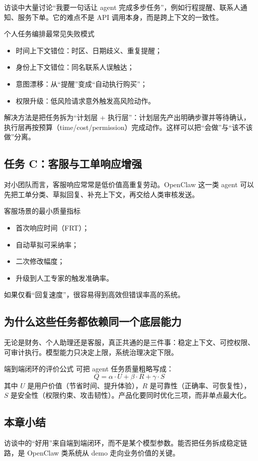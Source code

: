 访谈中大量讨论“我要一句话让 agent 完成多步任务”，例如行程提醒、联系人通知、服务下单。它的难点不是 API 调用本身，而是跨上下文的一致性。

\begin{warningbox}{个人任务编排最常见失败模式}
\begin{itemize}
    \item 时间上下文错位：时区、日期歧义、重复提醒；
    \item 身份上下文错位：同名联系人误触达；
    \item 意图漂移：从“提醒”变成“自动执行购买”；
    \item 权限升级：低风险请求意外触发高风险动作。
\end{itemize}
\end{warningbox}

解决方法是把任务拆为“计划层 + 执行层”：计划层先产出明确步骤并等待确认，执行层再按预算（time/cost/permission）完成动作。这样可以把“会做”与“该不该做”分离。

\subsection{任务 C：客服与工单响应增强}

对小团队而言，客服响应常常是低价值高重复劳动。OpenClaw 这一类 agent 可以先把工单分类、草拟回复、补充上下文，再交给人类审核发送。

\begin{knowledgebox}{客服场景的最小质量指标}
\begin{itemize}
    \item 首次响应时间（FRT）；
    \item 自动草拟可采纳率；
    \item 二次修改幅度；
    \item 升级到人工专家的触发准确率。
\end{itemize}
如果仅看“回复速度”，很容易得到高效但错误率高的系统。
\end{knowledgebox}

\subsection{为什么这些任务都依赖同一个底层能力}

无论是财务、个人助理还是客服，真正共通的是三件事：稳定上下文、可控权限、可审计执行。模型能力只决定上限，系统治理决定下限。

\begin{importantbox}{端到端闭环的评价公式}
可把 agent 任务质量粗略写成：
\[
Q = \alpha \cdot U + \beta \cdot R + \gamma \cdot S
\]
其中 \(U\) 是用户价值（节省时间、提升体验），\(R\) 是可靠性（正确率、可恢复性），\(S\) 是安全性（权限约束、攻击韧性）。产品化要同时优化三项，而非单点最大化。
\end{importantbox}

\subsection{本章小结}
访谈中的“好用”来自端到端闭环，而不是某个模型参数。能否把任务拆成稳定链路，是 OpenClaw 类系统从 demo 走向业务价值的关键。

